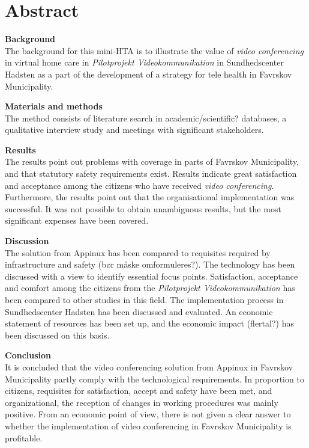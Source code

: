 \chapter{Abstract}

\textbf{Background}\\
The background for this mini-HTA is to illustrate the value of \textit{video conferencing} in virtual home care in \textit{Pilotprojekt Videokommunikation} in Sundhedscenter Hadsten as a part of the development of a strategy for tele health in Favrskov Municipality.

\textbf{Materials and methods}\\
The method consists of literature search in academic/scientific? databases, a qualitative interview study and meetings with significant stakeholders.

\textbf{Results}\\
The results point out problems with coverage in parts of Favrskov Municipality, and that statutory safety requirements exist. Results indicate great satisfaction and acceptance among the citizens who have received \textit{video conferencing}. Furthermore, the results point out that the organisational implementation was successful. It was not possible to obtain unambiguous results, but the most significant expenses have been covered.

\textbf{Discussion}\\
The solution from Appinux has been compared to requisites required by infrastructure and safety (bør måske omformuleres?). The technology has been discussed with a view to identify essential focus points. Satisfaction, acceptance and comfort among the citizens from the  \textit{Pilotprojekt Videokommunikation} has been compared to other studies in this field. The implementation process in Sundhedscenter Hadsten has been discussed and evaluated. An economic statement of resources has been set up, and the economic impact (flertal?) has been discussed on this basis.

\textbf{Conclusion}\\
It is concluded that the video conferencing solution from Appinux in Favrskov Municipality partly comply with the technological requirements. In proportion to citizens, requisites for satisfaction, accept and safety have been met, and organizational, the reception of changes in working procedures was mainly positive. From an economic point of view, there is not given a clear answer to whether the implementation of video conferencing in Favrskov Municipality is profitable.
